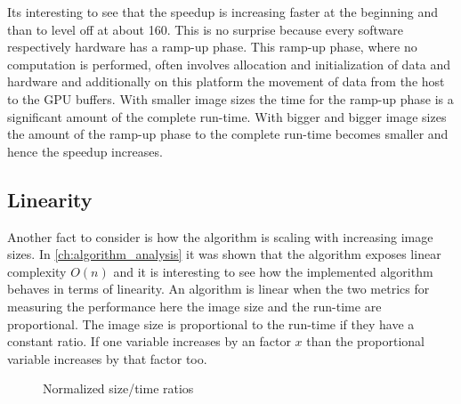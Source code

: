 Its interesting to see that the speedup is increasing faster at the beginning
and than to level off at about 160. This is no surprise because every software
respectively hardware has a ramp-up phase. This ramp-up phase, where no
computation is performed, often involves allocation and initialization of data
and hardware and additionally on this platform the movement of data from the
host to the \gls{GPU} buffers. With smaller image sizes the time for the ramp-up
phase is a significant amount of the complete run-time. With bigger and bigger
image sizes the amount of the ramp-up phase to the complete run-time becomes 
smaller and hence the speedup increases. 

\subsection{Linearity} %
\label{ssub:linearity}
Another fact to consider is how the algorithm is scaling with increasing image
sizes. In \autoref{ch:algorithm_analysis} it was shown that the algorithm
exposes linear complexity $O(n)$ and it is interesting to see how the
implemented algorithm behaves in terms of linearity. An algorithm is linear when
the two metrics for measuring the performance here the image size and the
run-time are proportional. The image size is proportional to the run-time if 
they have a constant ratio. If one variable increases by an factor $x$ than the
proportional variable increases by that factor too.
\begin{figure}[ht]
  \centering
	

	\tableA

	\caption{Normalized size/time ratios}%
	\label{fig:linearity}
 \end{figure}

